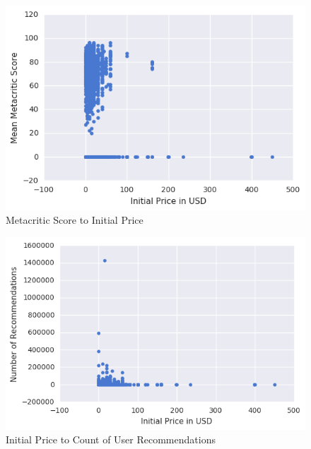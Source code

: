 \documentclass[letterpaper,10pt,twocolumn]{article}
\begin{document}
\begin{figure}[p]
    \caption{Metacritic Score to Initial Price \label{fig:metacritic-price-all}}
    \includegraphics[width=\textwidth,keepaspectratio]{price-metacritic-scatter-all}
\end{figure}

\begin{figure}[p]
    \caption{Initial Price to Count of User Recommendations \label{fig:price-recommendations-all}}
    \includegraphics[width=\textwidth,keepaspectratio]{price-recommendations-scatter-all}
\end{figure}
\end{document}
